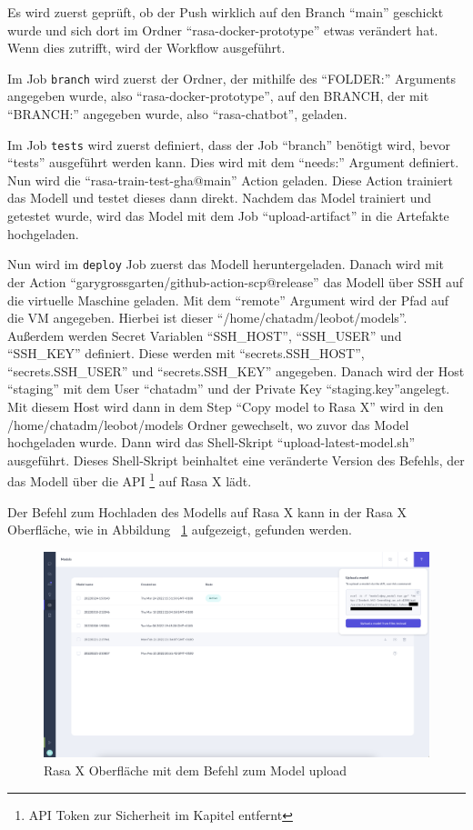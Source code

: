 Es wird zuerst geprüft, ob der Push wirklich auf den Branch ``main'' geschickt wurde und sich dort im Ordner ``rasa-docker-prototype'' etwas verändert hat.
Wenn dies zutrifft, wird der Workflow ausgeführt.

Im Job \texttt{branch} wird zuerst der Ordner, der mithilfe des ``FOLDER:'' Arguments angegeben wurde, also ``rasa-docker-prototype'', auf den BRANCH, der mit ``BRANCH:'' angegeben wurde, also ``rasa-chatbot'', geladen.

Im Job \texttt{tests} wird zuerst definiert, dass der Job ``branch'' benötigt wird, bevor ``tests'' ausgeführt werden kann.
Dies wird mit dem ``needs:'' Argument definiert.
Nun wird die ``rasa-train-test-gha@main'' Action geladen.
Diese Action trainiert das Modell und testet dieses dann direkt.
Nachdem das Model trainiert und getestet wurde, wird das Model mit dem Job ``upload-artifact'' in die Artefakte hochgeladen.

Nun wird im \texttt{deploy} Job zuerst das Modell heruntergeladen.
Danach wird mit der Action ``garygrossgarten/github-action-scp@release'' das Modell über SSH auf die virtuelle Maschine geladen.
Mit dem ``remote'' Argument wird der Pfad auf die VM angegeben.
Hierbei ist dieser ``/home/chatadm/leobot/models''.
Außerdem werden Secret Variablen ``SSH\_HOST'', ``SSH\_USER'' und ``SSH\_KEY'' definiert.
Diese werden mit ``secrets.SSH\_HOST'', ``secrets.SSH\_USER'' und ``secrets.SSH\_KEY'' angegeben.
Danach wird der Host ``staging'' mit dem User ``chatadm'' und der Private Key ``staging.key''angelegt.
Mit diesem Host wird dann in dem Step ``Copy model to Rasa X'' wird in den /home/chatadm/leobot/models Ordner gewechselt, wo zuvor das Model hochgeladen wurde.
Dann wird das Shell-Skript ``upload-latest-model.sh'' ausgeführt.
Dieses Shell-Skript beinhaltet eine veränderte Version des Befehls, der das Modell über die API \footnote{API Token zur Sicherheit im Kapitel entfernt} auf Rasa X lädt.

Der Befehl zum Hochladen des Modells auf Rasa X kann in der Rasa X Oberfläche, wie in Abbildung ~\ref{fig:impl:rasaxapimodel} aufgezeigt, gefunden werden.

\begin{figure}[hbt!]
    \centering
    \includegraphics[scale=0.2]{pics/rasaxapimodel}
    \caption{Rasa X Oberfläche mit dem Befehl zum Model upload}
    \label{fig:impl:rasaxapimodel}
\end{figure}

